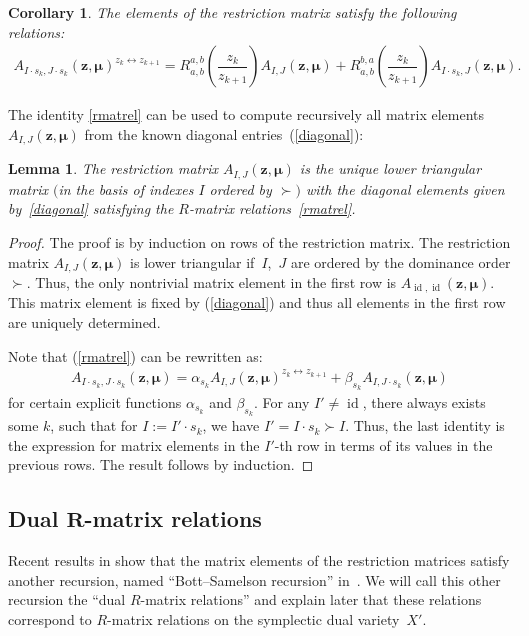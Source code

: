 \documentclass[10pt,a4paper]{amsart}
\DeclareMathOperator\id{id}
\def\zz{{\boldsymbol z}}
\def\mub{{\boldsymbol\mu}}
\numberwithin{equation}{section}
\newtheorem{Corollary}[Theorem]{Corollary}
\newtheorem{Lemma}[Theorem]{Lemma}
\begin{document}
\begin{Corollary} \label{cor1}The elements of the restriction matrix satisfy the following relations:
\begin{gather} \label{rmatrel}
A_{I\cdot s_{k} ,J \cdot s_{k}}(\zz,\mub)^{z_{k}\leftrightarrow z_{k+1}}=R^{a,b}_{a,b} \left( \dfrac{z_k}{z_{k+1}} \right) A_{I,J}(\zz,\mub) + R^{b,a}_{a,b} \left( \dfrac{z_k}{z_{k+1}} \right) A_{I \cdot s_k, J}(\zz,\mub).
\end{gather}
\end{Corollary}The identity \eqref{rmatrel} can be used to compute recursively all matrix elements $A_{I,J}(\zz,\mub)$ from the known diagonal entries~(\ref{diagonal}):
\begin{Lemma} \label{reclem}
The restriction matrix $A_{I,J}(\zz,\mub)$ is the unique lower triangular matrix $($in the basis of indexes $I$ ordered by $\succ)$ with the diagonal elements given by~\eqref{diagonal} satisfying the $R$-matrix relations~\eqref{rmatrel}.
\end{Lemma}
\begin{proof}The proof is by induction on rows of the restriction matrix. The restriction matrix $A_{I,J}(\zz,\mub)$ is lower triangular if~$I$,~$J$ are ordered
by the dominance order $\succ$. Thus, the only nontrivial matrix element in the first row is $A_{\id,\id}(\zz,\mub)$. This matrix element is fixed by (\ref{diagonal}) and thus all elements in the first row are uniquely determined.

Note that (\ref{rmatrel}) can be rewritten as:
\begin{gather*}
A_{I\cdot s_k,J \cdot s_k}(\zz,\mub)= \alpha_{s_k} A_{I,J}(\zz,\mub)^{z_{k}\leftrightarrow z_{k+1}}+\beta_{s_k} A_{I,J \cdot s_k}(\zz,\mub)
\end{gather*}
for certain explicit functions $\alpha_{s_k}$ and $\beta_{s_k}$. For any $I' \neq \id$, there always exists some $k$, such that for $I := I' \cdot s_k$, we have $I' = I\cdot s_k \succ I$. Thus, the last identity is the expression for matrix elements in the $I'$-th row in terms of its values in the previous rows. The result follows by induction.
\end{proof}

\subsection[Dual $R$-matrix relations]{Dual $\boldsymbol{R}$-matrix relations}
Recent results in \cite{RW} show that the matrix elements of the restriction matrices satisfy another recursion, named ``Bott--Samelson recursion'' in~\cite{RW}. We will call this other recursion the ``dual $R$-matrix relations'' and explain later that these relations correspond to $R$-matrix relations on the symplectic dual variety~$X'$.
\end{document}
